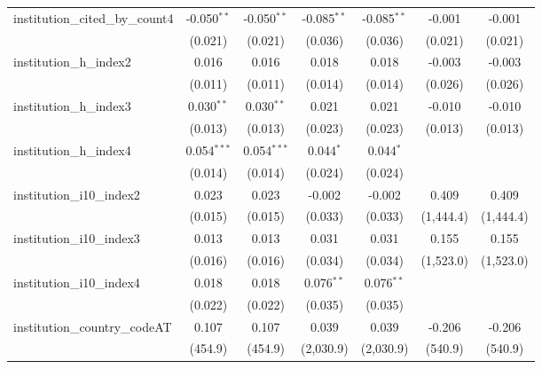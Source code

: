 \begin{tabular}{lcccccc}
   institution\_cited\_by\_count4        & -0.050$^{**}$ & -0.050$^{**}$ & -0.085$^{**}$  & -0.085$^{**}$  & -0.001    & -0.001\\   
                                         & (0.021)       & (0.021)       & (0.036)        & (0.036)        & (0.021)   & (0.021)\\   
   institution\_h\_index2                & 0.016         & 0.016         & 0.018          & 0.018          & -0.003    & -0.003\\   
                                         & (0.011)       & (0.011)       & (0.014)        & (0.014)        & (0.026)   & (0.026)\\   
   institution\_h\_index3                & 0.030$^{**}$  & 0.030$^{**}$  & 0.021          & 0.021          & -0.010    & -0.010\\   
                                         & (0.013)       & (0.013)       & (0.023)        & (0.023)        & (0.013)   & (0.013)\\   
   institution\_h\_index4                & 0.054$^{***}$ & 0.054$^{***}$ & 0.044$^{*}$    & 0.044$^{*}$    &           &   \\   
                                         & (0.014)       & (0.014)       & (0.024)        & (0.024)        &           &   \\   
   institution\_i10\_index2              & 0.023         & 0.023         & -0.002         & -0.002         & 0.409     & 0.409\\   
                                         & (0.015)       & (0.015)       & (0.033)        & (0.033)        & (1,444.4) & (1,444.4)\\   
   institution\_i10\_index3              & 0.013         & 0.013         & 0.031          & 0.031          & 0.155     & 0.155\\   
                                         & (0.016)       & (0.016)       & (0.034)        & (0.034)        & (1,523.0) & (1,523.0)\\   
   institution\_i10\_index4              & 0.018         & 0.018         & 0.076$^{**}$   & 0.076$^{**}$   &           &   \\   
                                         & (0.022)       & (0.022)       & (0.035)        & (0.035)        &           &   \\   
   institution\_country\_codeAT          & 0.107         & 0.107         & 0.039          & 0.039          & -0.206    & -0.206\\   
                                         & (454.9)       & (454.9)       & (2,030.9)      & (2,030.9)      & (540.9)   & (540.9)\\   

\end{tabular}
